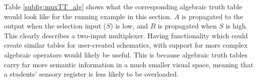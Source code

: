 Table \ref{subfig:muxTT_alg} shows what the corresponding algebraic truth table would look like for the running example in this section.
$A$ is propagated to the output when the selection input ($S$) is low, and $B$ is propagated when $S$ is high. This clearly describes a two-input multiplexer. Having functionality which could create similar tables for user-created schematics, with support for more complex algebraic operators would likely be useful. This is because algebraic truth tables carry far more semantic information in a much smaller visual space, meaning that a students' sensory register is less likely to be overloaded.

\begin{table}[h]
    \centering
    \medskip
    \medskip
    \medskip
    \caption{Truth Tables for a 2-bit Multiplexer}
    \label{tab:muxTTs}
\end{table}


